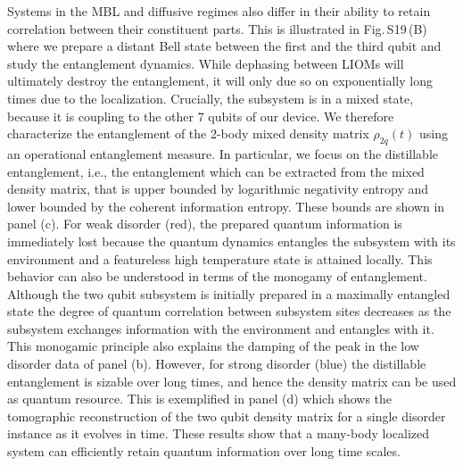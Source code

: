 Systems in the MBL and diffusive regimes also differ in their ability to retain correlation between their constituent parts.  This is illustrated in Fig.\,S19\,(B) where we prepare a distant Bell state between the first and the third qubit and study the entanglement dynamics.
While dephasing between LIOMs will ultimately destroy the entanglement, it will only due so on exponentially long times due to the localization.
Crucially, the subsystem is in a mixed state, because it is coupling to the other 7 qubits of our device.
We therefore characterize the entanglement of the 2-body mixed density matrix $\rho_{2q} \left( t \right)$ using an operational entanglement measure.
In particular, we focus on the distillable entanglement, i.e., the entanglement which can be extracted from the mixed density matrix, that is upper bounded by logarithmic negativity entropy and lower bounded by the coherent information entropy.
These bounds are shown in panel (c). For weak disorder (red), the prepared quantum information is immediately lost because the quantum dynamics entangles the subsystem with its environment and a featureless high temperature state is attained locally.
%
This behavior can also be understood in terms of the monogamy of entanglement.\autocite{Wootters2000}
Although the two qubit subsystem is initially prepared in a maximally entangled state the degree of quantum correlation between subsystem sites decreases as the subsystem exchanges information with the environment and entangles with it.
This monogamic principle also explains the damping of the peak in the low disorder data of panel (b).
%
However, for strong disorder (blue) the distillable entanglement is sizable over long times, and hence the density matrix can be used as quantum resource.
This is exemplified in panel (d) which shows the tomographic reconstruction of the two qubit density matrix for a single disorder instance as it evolves in time.
These results show that a many-body localized system can efficiently retain quantum information over long time scales.

